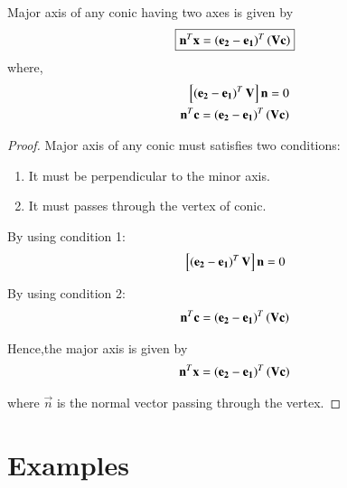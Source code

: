 \documentclass[journal,12pt,twocolumn]{IEEEtran}
\begin{document}
\begin{lemma}
Major axis of any conic having two axes is given by
\begin{align}
    \boxed{\mathbf{n}^T\mathbf{x} = \left(\mathbf{e_2}-\mathbf{e_1}\right)^T\left(\mathbf{V}\mathbf{c}\right)}
\end{align}
where,
\begin{align}
    {}\left[\left(\mathbf{e_2}-\mathbf{e_1}\right)^T\mathbf{V}\right]\mathbf{n} = 0 
    \\
    \mathbf{n}^T\mathbf{c} = \left(\mathbf{e_2}-\mathbf{e_1}\right)^T\left(\mathbf{V}\mathbf{c}\right)
\end{align}
\end{lemma}

\begin{proof}
Major axis of any conic must satisfies two conditions:

\begin{enumerate}
    \item It must be perpendicular to the minor axis.
    \item It must passes through the vertex of conic.
\end{enumerate}

By using condition 1:
\begin{align}
    {}\left[\left(\mathbf{e_2}-\mathbf{e_1}\right)^T\mathbf{V}\right]\mathbf{n} = 0 
\end{align}

By using condition 2:
\begin{align}
    \mathbf{n}^T\mathbf{c} = \left(\mathbf{e_2}-\mathbf{e_1}\right)^T\left(\mathbf{V}\mathbf{c}\right)
\end{align}

Hence,the major axis is given by
\begin{align}
   \mathbf{n}^T\mathbf{x} = \left(\mathbf{e_2}-\mathbf{e_1}\right)^T\left(\mathbf{V}\mathbf{c}\right)
\end{align}

where $\vec{n}$ is the normal vector passing through the vertex.
\end{proof}

\section{Examples}
\end{document}
